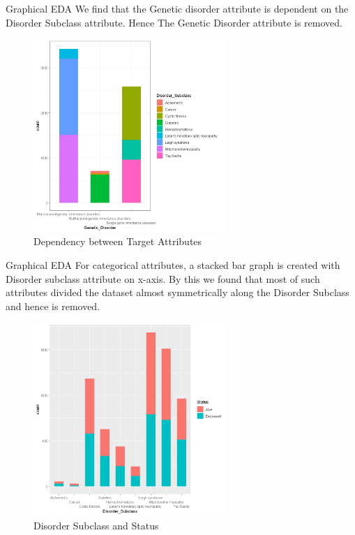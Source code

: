 \documentclass{beamer}
\begin{document}
		\begin{frame}{Graphical EDA}
		We find that the Genetic disorder attribute is dependent on the Disorder Subclass attribute. Hence The Genetic Disorder attribute is removed.
		\begin{figure}
			\includegraphics[width=0.65\textwidth, height=0.6\textheight]{rel.png}
			\caption{Dependency between Target Attributes}
		\end{figure}
	\end{frame}
\begin{frame}{Graphical EDA}
For categorical attributes, a stacked bar graph is created with Disorder subclass attribute on x-axis. By this we found that most of such attributes divided the dataset almost symmetrically along the Disorder Subclass and hence is removed.

\begin{figure}
	\includegraphics[width=0.65\textwidth, height=0.6\textheight]{status.png}
	\caption{Disorder Subclass and Status}
\end{figure}
\end{frame}
\end{document}
